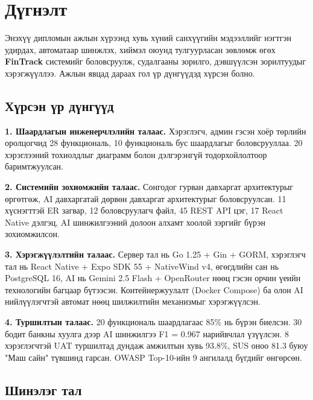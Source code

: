 
\pagecolor{white}

\section*{\centering \huge{Дүгнэлт}}

Энэхүү дипломын ажлын хүрээнд хувь хүний санхүүгийн мэдээллийг нэгтгэн удирдах, автоматаар шинжлэх, хиймэл оюунд тулгуурласан зөвлөмж өгөх \textbf{FinTrack} системийг боловсруулж, судалгааны зорилго, дэвшүүлсэн зорилтуудыг хэрэгжүүллээ. Ажлын явцад дараах гол үр дүнгүүдэд хүрсэн болно.

\subsection*{Хүрсэн үр дүнгүүд}

\textbf{1. Шаардлагын инженерчлэлийн талаас.} Хэрэглэгч, админ гэсэн хоёр төрлийн оролцогчид 28 функциональ, 10 функциональ бус шаардлагыг боловсрууллаа. 20 хэрэглээний тохиолдлыг диаграмм болон дэлгэрэнгүй тодорхойлолтоор баримтжуулсан.

\textbf{2. Системийн зохиомжийн талаас.} Сонгодог гурван давхаргат архитектурыг өргөтгөж, AI давхаргатай дөрвөн давхаргат архитектурыг боловсруулсан. 11 хүснэгттэй ER загвар, 12 боловсруулагч файл, 45 REST API цэг, 17 React Native дэлгэц, AI шинжилгээний долоон алхамт хоолой зэргийг бүрэн зохиомжилсон.

\textbf{3. Хэрэгжүүлэлтийн талаас.} Сервер тал нь Go 1.25 + Gin + GORM, хэрэглэгч тал нь React Native + Expo SDK 55 + NativeWind v4, өгөгдлийн сан нь PostgreSQL 16, AI нь Gemini 2.5 Flash + OpenRouter нөөц гэсэн орчин үеийн технологийн багцаар бүтээсэн. Контейнержуулалт (Docker Compose) ба олон AI нийлүүлэгчтэй автомат нөөц шилжилтийн механизмыг хэрэгжүүлсэн.

\textbf{4. Туршилтын талаас.} 20 функциональ шаардлагаас 85\% нь бүрэн биелсэн. 30 бодит банкны хуулга дээр AI шинжилгээ F1 = 0.967 нарийвчлал үзүүлсэн. 8 хэрэглэгчтэй UAT туршилтад дундаж амжилтын хувь 93.8\%, SUS оноо 81.3 буюу "Маш сайн" түвшинд гарсан. OWASP Top-10-ийн 9 ангилалд бүгдийг өнгөрсөн.

\subsection*{Шинэлэг тал}


